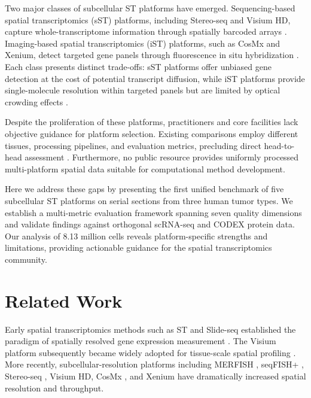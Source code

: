 \documentclass[11pt]{article}
\begin{document}
Two major classes of subcellular ST platforms have emerged. Sequencing-based spatial transcriptomics (sST) platforms, including Stereo-seq and Visium HD, capture whole-transcriptome information through spatially barcoded arrays \citep{chen2022spatiotemporal, kleshchevnikov2022cell2location}. Imaging-based spatial transcriptomics (iST) platforms, such as CosMx and Xenium, detect targeted gene panels through fluorescence in situ hybridization \citep{he2022high, janesick2023high}. Each class presents distinct trade-offs: sST platforms offer unbiased gene detection at the cost of potential transcript diffusion, while iST platforms provide single-molecule resolution within targeted panels but are limited by optical crowding effects \citep{zhuang2021spatially, marx2021method}.

Despite the proliferation of these platforms, practitioners and core facilities lack objective guidance for platform selection. Existing comparisons employ different tissues, processing pipelines, and evaluation metrics, precluding direct head-to-head assessment \citep{walker2023deciphering, lee2024benchmarking}. Furthermore, no public resource provides uniformly processed multi-platform spatial data suitable for computational method development.

Here we address these gaps by presenting the first unified benchmark of five subcellular ST platforms on serial sections from three human tumor types. We establish a multi-metric evaluation framework spanning seven quality dimensions and validate findings against orthogonal scRNA-seq and CODEX protein data. Our analysis of 8.13 million cells reveals platform-specific strengths and limitations, providing actionable guidance for the spatial transcriptomics community.

\section{Related Work}

Early spatial transcriptomics methods such as ST and Slide-seq established the paradigm of spatially resolved gene expression measurement \citep{stahl2016visualization, rodriques2019slide}. The Visium platform subsequently became widely adopted for tissue-scale spatial profiling \citep{andersson2021single}. More recently, subcellular-resolution platforms including MERFISH \citep{chen2015spatially}, seqFISH+ \citep{eng2019transcriptome}, Stereo-seq \citep{chen2022spatiotemporal}, Visium HD, CosMx \citep{he2022high}, and Xenium \citep{janesick2023high} have dramatically increased spatial resolution and throughput.
\end{document}
